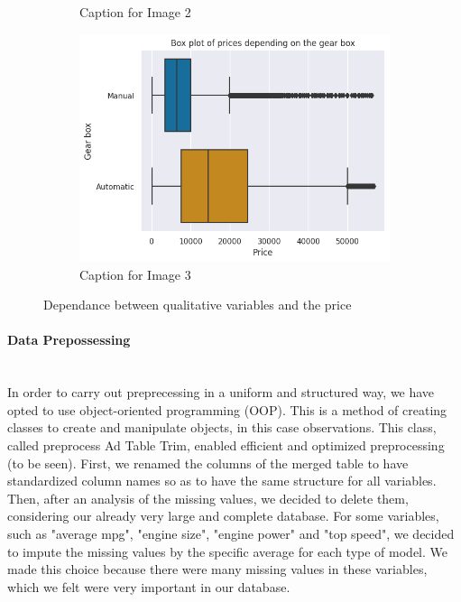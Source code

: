 \documentclass[12pt]{article}
\begin{document}
\begin{figure}[ht]
\begin{subfigure}{0.32\textwidth}
    \caption{Caption for Image 2}
    \label{fig:image2}
  \end{subfigure}
  \hfill
  \begin{subfigure}{0.30\textwidth}
    \includegraphics[width=\linewidth]{gear box.png}
    \caption{Caption for Image 3}
    \label{fig:image3}
  \end{subfigure}
  \caption{Dependance between qualitative variables and the price}
  \label{fig:threeimages}
\end{figure}
\FloatBarrier



\paragraph{Data Prepossessing}
~~\\

\noindent In order to carry out preprecessing in a uniform and structured way, we have opted to use object-oriented programming (OOP). This is a method of creating classes to create and manipulate objects, in this case observations. This class, called preprocess Ad Table Trim, enabled efficient and optimized preprocessing (to be seen). First, we renamed the columns of the merged table to have standardized column names so as to have the same structure for all variables. Then, after an analysis of the missing values, we decided to delete them, considering our already very large and complete database. For some variables, such as "average mpg", "engine size", "engine power" and "top speed", we decided to impute the missing values by the specific average for each type of model. We made this choice because there were many missing values in these variables, which we felt were very important in our database. \\
\end{document}
